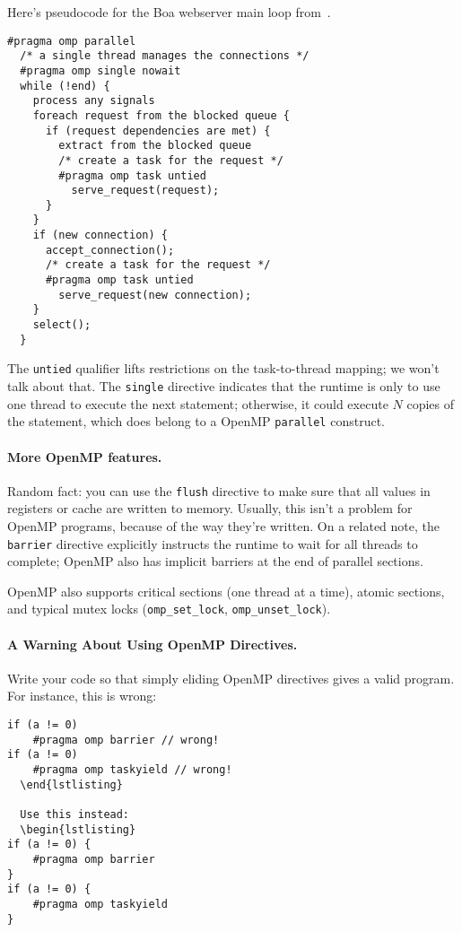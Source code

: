 Here's pseudocode for the Boa webserver main loop from~\cite{Ayguade:2009:DOT:1512157.1512430}.
{\small
\begin{verbatim}
#pragma omp parallel
  /* a single thread manages the connections */
  #pragma omp single nowait
  while (!end) {
    process any signals
    foreach request from the blocked queue {
      if (request dependencies are met) {
        extract from the blocked queue
        /* create a task for the request */
        #pragma omp task untied
          serve_request(request);
      }
    }
    if (new connection) {
      accept_connection();
      /* create a task for the request */
      #pragma omp task untied
        serve_request(new connection);
    }
    select();
  }
\end{verbatim}
}
The {\tt untied} qualifier lifts restrictions on the task-to-thread mapping;
we won't talk about that. The {\tt single} directive indicates that the
runtime is only to use one thread to execute the next statement; otherwise,
it could execute $N$ copies of the statement, which does belong to a
OpenMP {\tt parallel} construct.

\paragraph{More OpenMP features.} 
Random fact: you can use the {\tt flush} directive to make sure that
all values in registers or cache are written to memory. Usually, this
isn't a problem for OpenMP programs, because of the way they're
written. On a related note, the {\tt barrier} directive explicitly
instructs the runtime to wait for all threads to complete; OpenMP also
has implicit barriers at the end of parallel sections.  

OpenMP also supports critical sections (one thread at a time), atomic
sections, and typical mutex locks (\verb+omp_set_lock+,
\verb+omp_unset_lock+).

\paragraph{A Warning About Using OpenMP Directives.}
  Write your code so that simply eliding OpenMP directives gives a valid program. For instance, this is wrong:
  \begin{verbatim}
if (a != 0)
    #pragma omp barrier // wrong!
if (a != 0)
    #pragma omp taskyield // wrong!
  \end{lstlisting}

  Use this instead:
  \begin{lstlisting}
if (a != 0) {
    #pragma omp barrier
}
if (a != 0) {
    #pragma omp taskyield
}
  \end{verbatim}







